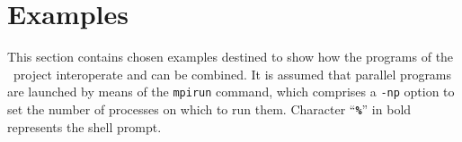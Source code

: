 
\section{Examples}
\label{sec-examples}

This section contains chosen examples destined to show how the programs
of the \ptscotch\ project interoperate and can be combined.
It is assumed that parallel programs are launched by means of the
{\tt mpirun} command, which comprises a {\tt -np} option to set the
number of processes on which to run them.
Character ``{\tt\bf \%}'' in bold represents the shell prompt.
